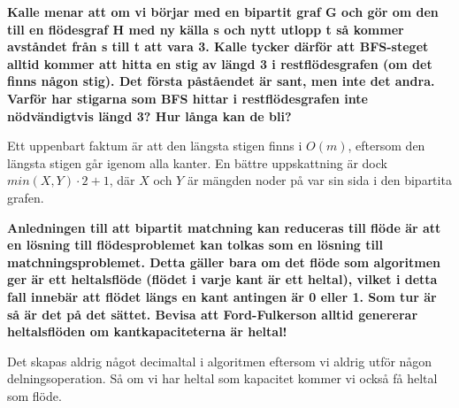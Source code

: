 \documentclass[11pt]{exam}
\begin{document}
\begin{questions}
\question \textbf{Kalle menar att om vi börjar med en bipartit graf G och gör om den till en flödesgraf H med ny källa s och nytt utlopp t så kommer avståndet från s till t att vara 3.
Kalle tycker därför att BFS-steget alltid kommer att hitta en stig av längd 3 i restflödesgrafen (om det finns någon stig).
Det första påståendet är sant, men inte det andra. Varför har stigarna som BFS hittar i restflödesgrafen inte nödvändigtvis längd 3? Hur långa kan de bli?}

Ett uppenbart faktum är att den längsta stigen finns i $O(m)$, eftersom den längsta stigen går igenom alla kanter. En bättre uppskattning är dock $min(X,Y)\cdot 2 + 1$, där $X$ och $Y$ är mängden noder på var sin sida i den bipartita grafen.

\question \textbf{Anledningen till att bipartit matchning kan reduceras till flöde är att en lösning till flödesproblemet kan tolkas som en lösning till matchningsproblemet. Detta gäller bara om det flöde som algoritmen ger är ett heltalsflöde (flödet i varje kant är ett heltal), vilket i detta fall innebär att flödet längs en kant antingen är 0 eller 1. Som tur är så är det på det sättet. Bevisa att Ford-Fulkerson alltid genererar heltalsflöden om kantkapaciteterna är heltal!}

Det skapas aldrig något decimaltal i algoritmen eftersom vi aldrig utför någon delningsoperation. Så om vi har heltal som kapacitet kommer vi också få heltal som flöde.

\end{questions}
\end{document}
